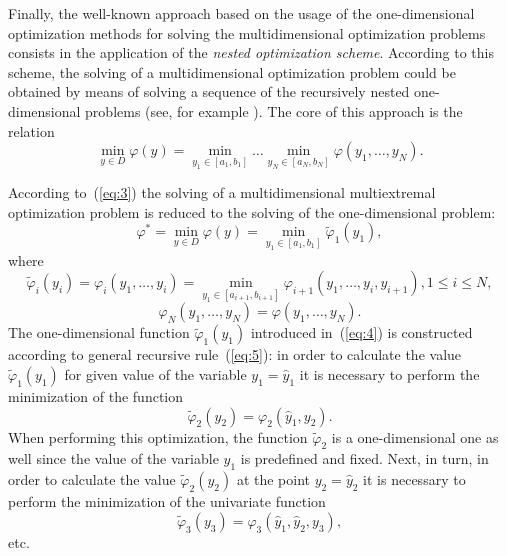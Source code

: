 \documentclass[smallextended]{svjour3}
\let\origref\ref
\renewcommand{\ref}[1]{(\origref{#1})}
\begin{document}
Finally, the well-known approach based on the usage of the one-dimensional optimization methods for solving the multidimensional optimization problems  consists in the application of the \textit{nested optimization scheme}. According to this scheme, the solving of a multidimensional optimization problem could be obtained by means of solving  a sequence of the recursively nested one-dimensional problems (see, for example \cite{Ref2, Ref3, Ref8, Ref12, Ref25, Ref28, Ref31, Ref36}). The core of this approach is the relation
\begin{equation}
\label{eq:3}
\min_{y \in D} \varphi(y) = \min_{y_1 \in [a_1, b_1]} \dots \min_{y_N \in [a_N, b_N]} \varphi(y_1, \dots, y_N).
\end{equation}

According to~\ref{eq:3} the solving of a multidimensional multiextremal optimization problem is reduced to the solving of the one-dimensional problem:
%
\begin{equation}
\label{eq:4}
\varphi^* = \min_{y \in D} \varphi(y) = \min_{y_1 \in [a_1, b_1]} \widetilde{\varphi}_1(y_1),
\end{equation}
%
where
%
\begin{equation}
\label{eq:5}
\widetilde{\varphi}_i(y_i) = \varphi_i(y_1, \dots, y_i) = \min_{y_1 \in [a_{i + 1}, b_{i + 1}]} \varphi_{i + 1}(y_1, \dots, y_i, y_{i + 1}), 1 \leq i \leq N,
\end{equation}
%
\begin{equation}
\label{eq:6}
\varphi_N(y_1, \dots, y_N) = \varphi(y_1, \dots, y_N).
\end{equation}
%
The one-dimensional function $\widetilde{\varphi}_1(y_1)$ introduced in~\ref{eq:4} is constructed according to general recursive rule~\ref{eq:5}: in order to calculate the value $\widetilde{\varphi}_1(y_1)$ for given value of the variable $y_1 = \hat{y}_1$ it is necessary to perform the minimization of the function
\begin{equation*}
\widetilde{\varphi}_2(y_2) = \varphi_2(\hat{y}_1, y_2).
\end{equation*}
%
When performing this optimization, the function $\widetilde{\varphi}_2$ is a one-dimensional one as well since the value of the variable $y_1$ is predefined and fixed. Next, in turn, in order to calculate the value $\widetilde{\varphi}_2(y_2)$ at the point $y_2 = \hat{y}_2$ it is necessary to perform the minimization of the univariate function
\begin{equation*}
\widetilde{\varphi}_3(y_3) = \varphi_3(\hat{y}_1, \hat{y}_2, y_3),
\end{equation*}
%
etc.
\end{document}
